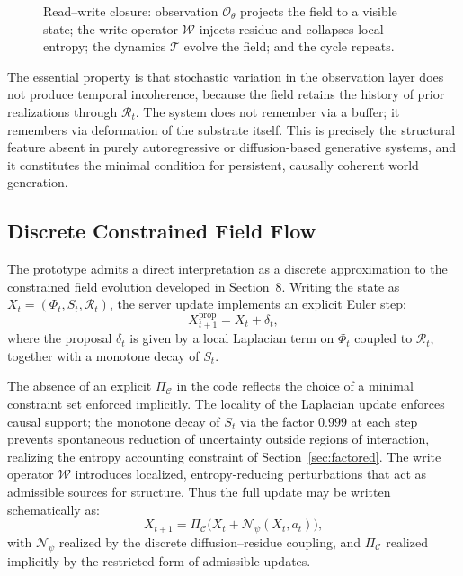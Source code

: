 \documentclass[11pt]{article}
\begin{document}
\begin{figure}[h]
\centering
{}
\caption{Read--write closure: observation $\mathcal{O}_\theta$ projects
the field to a visible state; the write operator $\mathcal{W}$ injects
residue and collapses local entropy; the dynamics $\mathcal{T}$ evolve
the field; and the cycle repeats.}
\end{figure}

The essential property is that stochastic variation in the observation
layer does not produce temporal incoherence, because the field retains the
history of prior realizations through $\mathcal{R}_t$.
The system does not remember via a buffer; it remembers via deformation of
the substrate itself.
This is precisely the structural feature absent in purely autoregressive
or diffusion-based generative systems, and it constitutes the minimal
condition for persistent, causally coherent world generation.

\subsection*{Discrete Constrained Field Flow}

The prototype admits a direct interpretation as a discrete approximation
to the constrained field evolution developed in Section~8.
Writing the state as $X_t = (\Phi_t, S_t, \mathcal{R}_t)$, the server
update implements an explicit Euler step:
\[
X_{t+1}^{\mathrm{prop}} = X_t + \delta_t,
\]
where the proposal $\delta_t$ is given by a local Laplacian term on
$\Phi_t$ coupled to $\mathcal{R}_t$, together with a monotone decay of
$S_t$.

The absence of an explicit $\Pi_{\mathcal{C}}$ in the code reflects the
choice of a minimal constraint set enforced implicitly.
The locality of the Laplacian update enforces causal support; the monotone
decay of $S_t$ via the factor $0.999$ at each step prevents spontaneous
reduction of uncertainty outside regions of interaction, realizing the
entropy accounting constraint of Section~\ref{sec:factored}.
The write operator $\mathcal{W}$ introduces localized, entropy-reducing
perturbations that act as admissible sources for structure.
Thus the full update may be written schematically as:
\[
X_{t+1} = \Pi_{\mathcal{C}}\!\big(X_t + \mathcal{N}_\psi(X_t, a_t)\big),
\]
with $\mathcal{N}_\psi$ realized by the discrete diffusion--residue
coupling, and $\Pi_{\mathcal{C}}$ realized implicitly by the restricted
form of admissible updates.
\end{document}
